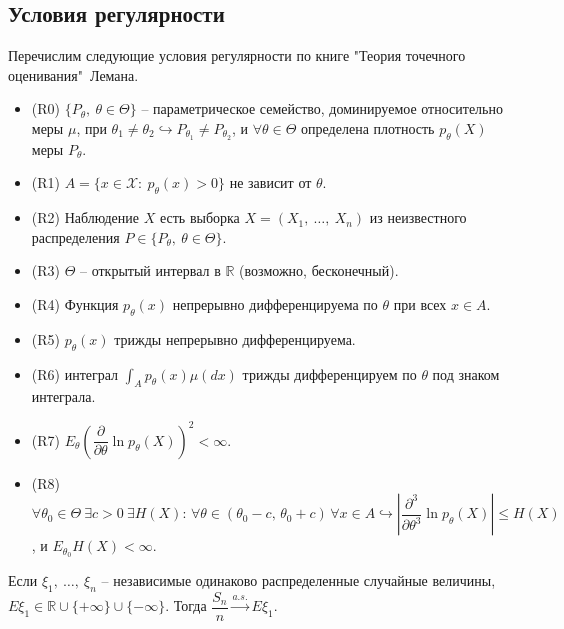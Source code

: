 \subsection{Условия регулярности}

Перечислим следующие условия регулярности по книге "Теория точечного оценивания"\, Лемана.
\begin{itemize}
    \item (R0) $\displaystyle \{P_{\theta } ,\ \theta \in \Theta \}$ -- параметрическое семейство, доминируемое относительно меры $\displaystyle \mu $, при $\displaystyle \theta _{1} \neq \theta _{2} \hookrightarrow P_{\theta _{1}} \neq P_{\theta _{2}}$, и $\displaystyle \forall \theta \in \Theta $ определена плотность $\displaystyle p_{\theta }( X)$ меры $\displaystyle P_{\theta }$.
    \item (R1) $\displaystyle A=\{x\in \mathcal{X} :\ p_{\theta }( x)  >0\}$ не зависит от $\displaystyle \theta $.
    \item (R2) Наблюдение $\displaystyle X$ есть выборка $\displaystyle X=( X_{1} ,\ \dotsc ,\ X_{n})$ из неизвестного распределения $\displaystyle P\in \{P_{\theta } ,\ \theta \in \Theta \}$.
    \item (R3) $\displaystyle \Theta $ -- открытый интервал в $\displaystyle \mathbb{R}$ (возможно, бесконечный).
    \item (R4) Функция $\displaystyle p_{\theta }(x)$ непрерывно дифференцируема по $\displaystyle \theta $ при всех $\displaystyle x\in A$.
    \item (R5) $\displaystyle p_{\theta }( x)$ трижды непрерывно дифференцируема.
    \item (R6) интеграл $\displaystyle \int _{A} p_{\theta }( x) \mu ( dx)$ трижды дифференцируем по $\displaystyle \theta $ под знаком интеграла.
    \item (R7) $\displaystyle E_{\theta }\left(\dfrac{\partial }{\partial \theta }\ln p_{\theta }( X)\right)^{2} < \infty $.
    \item (R8) $\displaystyle \forall \theta _{0} \in \Theta \ \exists c >0\ \exists H( X):\, \forall \theta \in (\theta_0 - c,\, \theta_0 + c)\, \forall x \in A \hookrightarrow \left| \dfrac{\partial ^{3}}{\partial \theta ^{3}}\ln p_{\theta }( X)\right| \leqslant H( X)$, и $\displaystyle E_{\theta _{0}} H( X) < \infty $.
\end{itemize}
\begin{lemma}
    Если $\displaystyle \xi _{1} ,\ \dotsc ,\ \xi _{n}$ -- независимые одинаково распределенные случайные величины, $\displaystyle E\xi _{1} \in \mathbb{R} \cup \{+\infty \} \cup \{-\infty \}$. Тогда $\displaystyle \dfrac{S_{n}}{n}\xrightarrow{a.s.} E\xi _{1}$.
\end{lemma}
